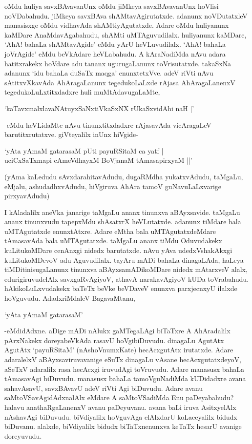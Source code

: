 oMdu huliya savxBAvavanUnx oMdu jiMkeya savxBAvavanUnx hoVlisi noVDabahudu. jiMkeya savxBAva shAMtavAgirutatxde. adanunx noVDutatxleV manasisxge oMdu vidhavAda shAMtiyAgutatxde. Adare oMdu huliyanunx kaMDare AnaMdavAgabahudu, shAMti uMTAguvudilalx. huliyanunx kaMDare, `AhA! bahaLa shAMtavAgide' eMdu yArU heVLuvudilalx. `AhA! bahaLa joVrAgide' eMdu beVkAdare heVLabahudu. A kAraNadiMda nAvu adara hatitxrakekx hoVdare adu tananx ugurugaLanunx toVrisutatxde. takaSxNa adanunx `idu bahaLa duSaTx maqga' enunxtetxVve. adeV riVti nAvu sAtitxvXkavAda AhAragaLanunx tegedukoLaLxde rAjasa AhAragaLanenxV tegedukoLuLxtitxdadxre huli muMtAdavugaLaMte,


\begin{shloka}
`kaTavxmalxlavaNAtuyxSaNxtiVkaSxNX rUkaSxvidAhi naH |'
\end{shloka}

-eMdu heVLidaMte nAvu tinunxtitxdadxre rAjasavAda vicAragaLeV barutitxrutatxve. giVteyalilx inUnx hiVgide-

\begin{shloka}
`yAta yAmaM gatarasaM pUti payuRSitaM ca yatf |\\
uciCxSaTxmapi cAmeVdhayxM BoVjanaM tAmasapirxyaM ||'
\end{shloka}

(yAma kaLedudu sAvxdarahitavAdudu, dugaRMdha yukatxvAdudu, taMgaLu, eMjalu, ashudadhxvAdudu, hiVgiruva AhAra tamoV guNavuLaLxvarige pirxyavAdudu)

I kAladalilx aneVka janarige taMgaLu ananx tinunxva aBAyxsavide. taMgaLu ananx tinunxvudu tapepxMdu shAsatxrX heVLutatxde. adanunx tiMdare bala uMTAgutatxde enunxtAtxre. Adare eMtha bala uMTAgutatxdeMdare tAmasavAda bala uMTAgutatxde. taMgaLu ananx tiMdu Oduvudakekx kuLitukoMDare cenAnxgi nidedx barutatxde. nAvu yAva udedxVshakAkxgi kuLitukoMDevoV adu Aguvudilalx. tayAru mADi bahaLa dinagaLAda, haLeya tiMDitinisugaLanunx tinunxva aBAyxsamADikoMDare nidedx mAtarxveV alalx, edurigiruvudelAlx savxgaRvAgiyoV, athavA narakavAgiyoV kUDa toVrabahudu. hAkikoLuLxvudakekx baTeTx beVke beVDaveV enunxva parxjecnxyU ilalxde hoVguvudu. AdadxriMdaleV BagavaMtanu,

\begin{shloka}
`yAta yAmaM gatarasaM'
\end{shloka}


-eMdidAdxne. aDige mADi nAlukx gaMTegaLAgi biTaTxre A AhAradalilx pArxNakekx doreyabeVkAda rasavU hoVgibiDuvudu. dinagaLu AgutAtx AgutAtx `payuRSitaM' (nAshoVnumxKate) hecAcxgutAtx irutatxde. Adare adaralelxV aBAyxsaviruvavanige eSuTx dinagaLu vAsane hecAcxgutatxdeyoV, aSeTxV adaralilx rasa hecAcxgi iruvudAgi toVruvudu. Adare manasusx bahaLa tAmasavAgi biDuvudu. manasusx bahaLa tamoVguNadiMda kUDidadxre avana sahavAsavU, savxBAvavU adeV riVti Agi biDuvudu. Adare avanu saMtoVSavAgidAdxnalAlx eMdare A saMtoVSadiMda Enu paDeyabahudu? halavu anathaRgaLanenxV avanu paDeyuvanu. avana baLi iruva AsitxyelAlx nAshavAgi biDuvudu. biVdiyalilx hoVguvAga elAlxdarU koLaceyalilx bidudx biDuvanu. alalxde, biVdiyalilx bidudx biTaTxnenunxva keTaTx hesarU avanige doreyuvudu.

